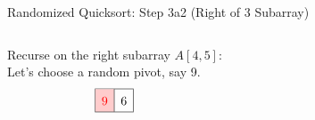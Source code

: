 \begin{frame}{Randomized Quicksort: Step 3a2 (Right of 3 Subarray)}
  \begin{columns}[t]
    Recurse on the right subarray $A[4,5]$:
    \\[0.5em]
    Let's choose a random pivot, say 9.
    \[
      \renewcommand{\arraystretch}{1.5}
      \begin{array}{|c|c|}
        \hline
        \cellcolor{red!20}\textcolor{red}{9} & 6 \\
        \hline
      \end{array}
    \]
    \begin{minipage}[t]{\linewidth}
      \vspace{0pt} %
      \begin{center}


\end{center}
\end{minipage}
\end{columns}
\end{frame}

